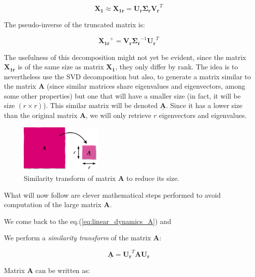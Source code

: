 \documentclass[10pt,twocolumn]{article}
\begin{document}
\begin{equation} \label{eq:solution-approx}
\mathbf{X_1} \approx \mathbf{X_{1r}} = \mathbf{U_r} \mathbf{\Sigma_r} \mathbf{V_r}^T 
\end{equation}

The pseudo-inverse of the truncated matrix is:

\begin{equation} \label{eq:pseudo-inverse}
\mathbf{X_{1r}}^{+} = \mathbf{V_r}  \mathbf{\Sigma_r}^{-1} \mathbf{U_r}^T
\end{equation}

The usefulness of this decomposition might not yet be evident, since the matrix $\mathbf{X_{1r}}$ is of the same size as matrix $\mathbf{X_{1}}$, they only differ by rank. The idea is to nevertheless use the SVD decomposition but also, to generate a matrix similar to the matrix $\mathbf{A}$ (since similar matrices share eigenvalues and eigenvectors, among some other properties) but one that will have a smaller size (in fact, it will be size $(r \times r)$). This similar matrix will be denoted $\underline{\mathbf{A}}$. Since it has a lower size than the original matrix $\mathbf{A}$, we will only retrieve $r$ eigenvectors and eigenvalues.

\begin{figure}
\centering\includegraphics[width=4cm]{similar-matrices.png}
\caption{Similarity transform of matrix $\mathbf{A}$ to reduce its size.}
\label{fig:similar-matrices}
\end{figure}

What will now follow are clever mathematical steps performed to avoid computation of the large matrix $\mathbf{A}$.

We come back to the eq.(\ref{eq:linear_dynamics_A}) and

We perform a \textit{similarity transform} of the matrix $\mathbf{A}$:

\begin{equation} \label{eq:similarity-transform}
\underline{\mathbf{A}} = \mathbf{U_r}^T \mathbf{A} \mathbf{U_r}
\end{equation}

Matrix $\mathbf{A}$ can be written as:
\end{document}

